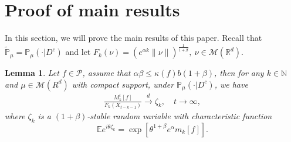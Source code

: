 \documentclass[12pt,oneside,english]{amsart}
\theoremstyle{plain}
\newtheorem{lem}[thm]{Lemma}
\theoremstyle{definition}
\numberwithin{equation}{section}
\begin{document}
\section{Proof of main results}

In this section, we will prove the main results of this paper. Recall that $\mathbb{\tilde{P}}_{\mu}=\mathbb{P}_{\mu}(\cdot|D^c)$ and let $F_k(\nu)=\left(e^{\alpha k}\|\nu\|\right)^{\frac{1}{1+\beta}},~ \nu\in \mathcal{M}(\mathbb{R}^d)$.
 \begin{lem}\label{lemma31}
 Let $f\in \mathcal{P}$, assume that $\alpha\beta\leq \kappa(f)b(1+\beta)$, then for any  $k\in\mathbb{N}$ and $\mu \in \mathcal{M}(R^d)$ with compact support, under $\mathbb{P}_{\mu}(\cdot | D ^c)$, we have
 \begin{align}
      \frac{M_k^t[f]}{F_k(X_{t-k-1})}\xrightarrow{d}\zeta_k, \quad t\rightarrow \infty, \label{limitdistribution1}
 \end{align}
 where $\zeta_k$ is a $(1+\beta)$-stable random variable with characteristic function
 $$\mathbb{E}e^{i\theta\zeta_k}=\exp\left[\theta^{1+\beta}e^{\alpha}m_k[f]\right].$$
 \end{lem}
\end{document}
